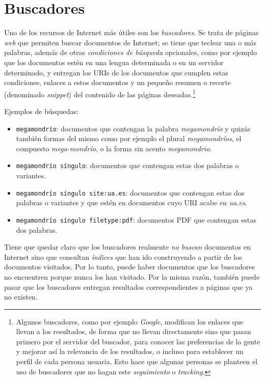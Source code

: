 \section{Buscadores} Uno de los recursos de Internet más útiles son los \emph{buscadores}. Se trata de páginas \emph{web} que permiten buscar documentos de Internet; se tiene que teclear una o más palabras, además de otras \emph{condiciones de búsqueda} opcionales, como por ejemplo que los documentos estén en una lengua determinada o en un servidor determinado, y entregan los URIs de los documentos que cumplen estas condiciones, enlaces a estos documentos y un pequeño resumen o recorte (denominado \emph{snippet}) del contenido de las páginas deseadas.\footnote{Algunos buscadores, como por ejemplo \emph{Google}, modifican los enlaces que llevan a los resultados, de forma que no llevan directamente sino que pasan primero por el servidor del buscador, para conocer las preferencias de la gente y mejorar así la relevancia de los resultados, o incluso para establecer un perfil de cada persona usuaria. Esto hace que algunas personas se planteen el uso de buscadores que no hagan este \emph{seguimiento} o \emph{tracking}.} 

Ejemplos de búsquedas: \begin{itemize} \item \texttt{megamondrío}: documentos que contengan la palabra \emph{megamondrío} y quizás también formas del mismo como por ejemplo el plural \emph{megamondríos}, el compuesto \emph{mega-mondrío}, o la forma sin acento \emph{megamondrio}. \item \texttt{megamondrío síngulo}: documentos que contengan estas dos palabras o variantes. \item \texttt{megamondrío síngulo site:ua.es}: documentos que contengan estas dos palabras o variantes y que estén en documentos cuyo URI acabe en \emph{ua.es}. \item \texttt{megamondrío síngulo filetype:pdf}: documentos PDF que contengan estas dos palabras. \end{itemize} 

Tiene que quedar claro que los buscadores realmente \emph{no buscan} documentos en Internet sino que consultan \emph{índices} que han ido construyendo a partir de los documentos visitados. Por lo tanto, puede haber documentos que los buscadores no encuentren porque nunca los han visitado. Por la misma razón, también puede pasar que los buscadores entregan resultados correspondientes a páginas que ya no existen. 

